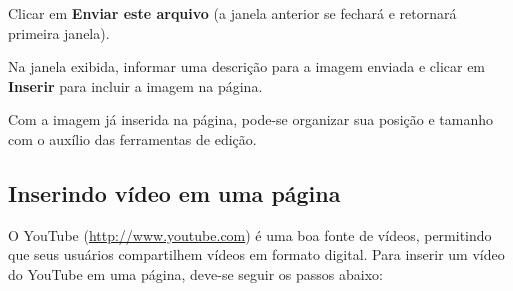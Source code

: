 Clicar em \textbf{Enviar este arquivo} (a janela anterior se fechará e retornará primeira janela).

Na janela exibida, informar uma descrição para a imagem enviada e clicar em \textbf{Inserir} para incluir a imagem na página.

Com a imagem já inserida na página, pode-se organizar sua posição e tamanho com o auxílio das ferramentas de edição.

\subsection{Inserindo vídeo em uma página}

O YouTube (\url{http://www.youtube.com}) é uma boa fonte de vídeos, permitindo que seus usuários compartilhem vídeos em formato digital.
Para inserir um vídeo do YouTube em uma página, deve-se seguir os passos abaixo:

